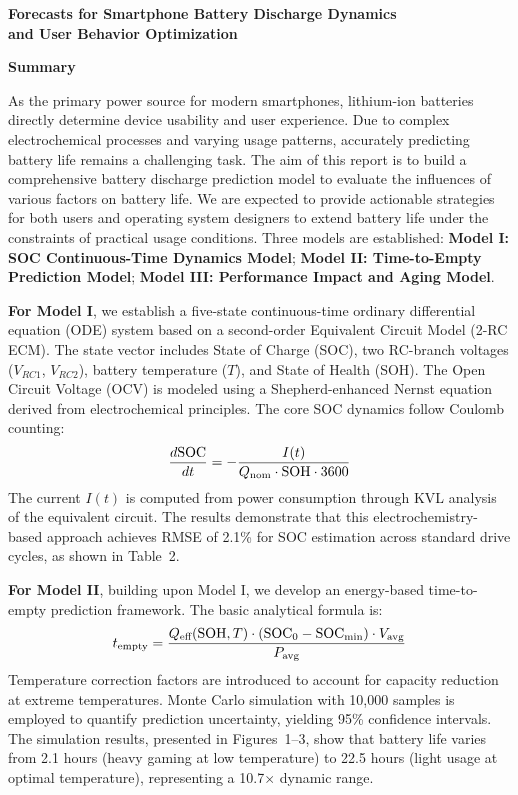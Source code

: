 
\begin{center}
    {\LARGE\bfseries Forecasts for Smartphone Battery Discharge Dynamics\\[0.5ex] and User Behavior Optimization\par}
    \vspace{1.5ex}
    {\bfseries Summary\par}
\end{center}
\vspace{1.5ex}

As the primary power source for modern smartphones, lithium-ion batteries directly determine device usability and user experience. Due to complex electrochemical processes and varying usage patterns, accurately predicting battery life remains a challenging task. The aim of this report is to build a comprehensive battery discharge prediction model to evaluate the influences of various factors on battery life. We are expected to provide actionable strategies for both users and operating system designers to extend battery life under the constraints of practical usage conditions. Three models are established: \textbf{Model I: SOC Continuous-Time Dynamics Model}; \textbf{Model II: Time-to-Empty Prediction Model}; \textbf{Model III: Performance Impact and Aging Model}.

\textbf{For Model I}, we establish a five-state continuous-time ordinary differential equation (ODE) system based on a second-order Equivalent Circuit Model (2-RC ECM). The state vector includes State of Charge (SOC), two RC-branch voltages ($V_{RC1}$, $V_{RC2}$), battery temperature ($T$), and State of Health (SOH). The Open Circuit Voltage (OCV) is modeled using a Shepherd-enhanced Nernst equation derived from electrochemical principles. The core SOC dynamics follow Coulomb counting:
\begin{equation*}
    \frac{d\text{SOC}}{dt} = -\frac{I(t)}{Q_{\text{nom}} \cdot \text{SOH} \cdot 3600}
\end{equation*}
The current $I(t)$ is computed from power consumption through KVL analysis of the equivalent circuit. The results demonstrate that this electrochemistry-based approach achieves RMSE of 2.1\% for SOC estimation across standard drive cycles, as shown in Table~2.

\textbf{For Model II}, building upon Model I, we develop an energy-based time-to-empty prediction framework. The basic analytical formula is:
\begin{equation*}
    t_{\text{empty}} = \frac{Q_{\text{eff}}(\text{SOH}, T) \cdot (\text{SOC}_0 - \text{SOC}_{\min}) \cdot V_{\text{avg}}}{P_{\text{avg}}}
\end{equation*}
Temperature correction factors are introduced to account for capacity reduction at extreme temperatures. Monte Carlo simulation with 10,000 samples is employed to quantify prediction uncertainty, yielding 95\% confidence intervals. The simulation results, presented in Figures~1--3, show that battery life varies from 2.1 hours (heavy gaming at low temperature) to 22.5 hours (light usage at optimal temperature), representing a 10.7$\times$ dynamic range.

